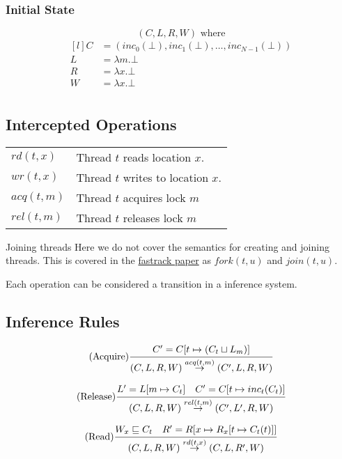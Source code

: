\subsubsection{Initial State}
\[(C, L, R, W) \text{ where}\]
\[\begin{matrix*}[l]
		C & = (inc_0(\bot), inc_1(\bot), \dots, inc_{N-1}(\bot)) \\
		L & = \lambda m . \bot \\
		R & = \lambda x . \bot \\
		W & = \lambda x . \bot \\
	\end{matrix*}\]

\subsection{Intercepted Operations}
\begin{center}
	\begin{tabular}{l p{}}
		$rd(t,x)$  & Thread $t$ reads location $x$.     \\
		$wr(t,x)$  & Thread $t$ writes to location $x$. \\
		$acq(t,m)$ & Thread $t$ acquires lock $m$       \\
		$rel(t,m)$ & Thread $t$ releases lock $m$       \\
	\end{tabular}
\end{center}

\begin{sidenotebox}{Joining threads}
	Here we do not cover the semantics for creating and joining threads. This is covered in the \href{https://users.soe.ucsc.edu/~cormac/papers/pldi09.pdf}{fastrack paper} as $fork(t,u)$ and $join(t,u)$.
\end{sidenotebox}

Each operation can be considered a transition in a inference system.

\subsection{Inference Rules}
\[(\text{Acquire})\cfrac{C' = C[t \mapsto (C_t \sqcup L_m)]}{(C,L,R,W) \overset{acq(t,m)}{\to} (C', L, R, W)} \]

\[(\text{Release})\cfrac{L' = L[m \mapsto C_t] \quad C' = C[t \mapsto inc_t(C_t)]}{(C,L,R,W) \overset{rel(t,m)}{\to} (C', L', R, W)} \]

\[(\text{Read})\cfrac{W_x \sqsubseteq C_t \quad R' = R[x \mapsto R_x[t \mapsto C_t(t)]]}{(C,L,R,W) \overset{rd(t,x)}{\to} (C,L,R',W)}\]

